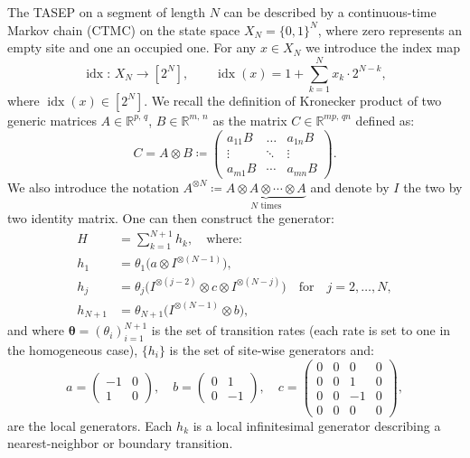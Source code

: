 \documentclass{article}
\begin{document}
The TASEP on a segment of length $N$ can be described by a continuous-time Markov chain (CTMC) on the state space $X_N=\{0,1\}^N$, where zero represents an empty site and one an occupied one. For any $x\in X_N$ we introduce the index map
\begin{equation*}
    \operatorname{idx}\colon \,X_N\to[2^N],\qquad
    \operatorname{idx}(x)=1+\sum_{k=1}^N x_k \cdot 2^{N-k},
\end{equation*}
where $\operatorname{idx}(x)\in\left[2^N\right]$.
We recall the definition of Kronecker product of two generic matrices $A\in\mathbb{R}^{p,\,q}$, $B\in\mathbb{R}^{m,\,n}$ as the matrix $C\in\mathbb{R} ^{mp,\,qn}$ defined as:
\[
C=A \otimes B \coloneq\left(\begin{array}{ccc}
        a_{11} B & \ldots & a_{1 n} B \\
        \vdots & \ddots & \vdots \\
        a_{m 1} B & \cdots & a_{m n} B
        \end{array}\right).
\]
We also introduce the notation $A^{\otimes N}\coloneq\underbrace{A\otimes A \otimes \cdots\otimes A}_{N\text{ times}}$ and denote by $I$ the two by two identity matrix.
One can then construct the generator:
\begin{align*}
    H &= \sum_{k=1}^{N+1} h_k, \quad\text{where:} \\
     h_1 &= \theta_1\big(a \otimes I^{\otimes(N-1)}\big),\\
    h_j &= \theta_j\big(I^{\otimes(j-2)} \otimes c \otimes I^{\otimes(N-j)}\big) \quad \text{for} \quad j=2,\dots,N, \\
    h_{N+1}&= \theta_{N+1}\big(I^{\otimes(N-1)} \otimes b\big),
\end{align*}
and where $\boldsymbol{\theta}=(\theta_i)_{i=1}^{N+1}$ is the set of transition rates (each rate is set to one in the homogeneous case), $\{h_i\}$ is the set of site-wise generators and:
\[    a=\begin{pmatrix}
    -1 & 0 \\
    1 & 0
    \end{pmatrix}, \quad 
    b=\begin{pmatrix}
    0 & 1 \\
    0 & -1
    \end{pmatrix}, \quad 
    c=\begin{pmatrix}
    0 & 0 & 0 & 0 \\
    0 & 0 & 1 & 0 \\
    0 & 0 & -1 & 0 \\
    0 & 0 & 0 & 0
    \end{pmatrix},
\]
are the local generators.
 Each $h_k$ is a local infinitesimal generator describing a nearest-neighbor or boundary transition.
\end{document}
